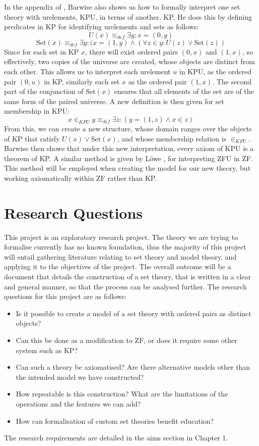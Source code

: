 \documentclass[11pt]{article}
\theoremstyle{definition}
\theoremstyle{theorem}
\theoremstyle{lemma}
\begin{document}
In the appendix of \cite{barwise}, Barwise also shows us how to formally interpret one set theory with urelements, KPU, in terms of another, KP.
He does this by defining predicates in KP for identifying urelements and sets as follows:
$$U(x) \equiv_{def} \exists y: x = (0,y)$$
$$\text{Set}(x) \equiv_{def} \exists y:(x = (1,y) \wedge (\forall z\in y: U(z) \vee \text{Set}(z))$$
Since for each set in KP $x$, there will exist ordered pairs $(0,x)$ and $(1,x)$, so effectively, two copies of the universe are created, whose objects are distinct from each other.
This allows us to interpret each urelement $u$ in KPU, as the ordered pair $(0,u)$ in KP, similarly each set $x$ as the ordered pair $(1,x)$.
The second part of the conjunction of $\text{Set}(x)$ ensures that all elements of the set are of the same form of the paired universe.
A new definition is then given for set membership in KPU:
$$x\in_{KPU} y \equiv_{def} \exists z: (y=(1,z) \wedge x\in z)$$
From this, we can create a new structure, whose domain ranges over the objects of KP that satisfy $U(x) \vee \text{Set}(x)$, and whose membership relation is $\in_{KPU}$.
Barwise then shows that under this new interpretation, every axiom of KPU is a theorem of KP.
A similar method is given by L\"owe \cite{lowe}, for interpreting ZFU in ZF.
This method will be employed when creating the model for our new theory, but working axiomatically within ZF rather than KP.

\section{Research Questions}
This project is an exploratory research project.
The theory we are trying to formalise currently has no known foundation, thus the majority of this project will entail gathering literature relating to set theory and model theory, and applying it to the objectives of the project.
The overall outcome will be a document that details the construction of a set theory, that is written in a clear and general manner, so that the process can be analysed further.
The research questions for this project are as follows:
\begin{itemize}
  \item Is it possible to create a model of a set theory with ordered pairs as distinct objects?
  \item Can this be done as a modification to ZF, or does it require some other system such as KP?
  \item Can such a theory be axiomatised? Are there alternative models other than the intended model we have constructed?
  \item How repeatable is this construction? What are the limitations of the operations and the features we can add?
  \item How can formalisation of custom set theories benefit education?
\end{itemize}
The research requirements are detailed in the aims section in Chapter 1.
\end{document}
